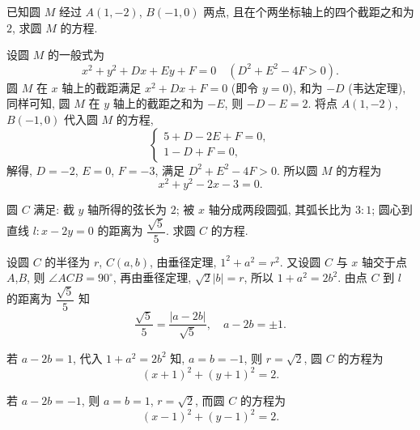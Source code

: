 \begin{exercise}
    已知圆 $M$ 经过 $A(1,-2)$, $B(-1,0)$ 两点, 且在个两坐标轴上的四个截距之和为 $2$, 求圆 $M$ 的方程.
\end{exercise}
\beginsolution
    设圆 $M$ 的一般式为
    \[x^2+y^2+Dx+Ey+F= 0\quad (D^2+E^2-4F>0).\]
    圆 $M$ 在 $x$ 轴上的截距满足 $x^2+Dx+F=0$ (即令 $y=0$), 和为 $-D$ (韦达定理), 同样可知, 圆 $M$ 在 $y$ 轴上的截距之和为 $-E$, 则 $-D-E=2$. 将点 $A(1,-2)$, $B(-1,0)$ 代入圆 $M$ 的方程,
    \[\left\{\!\!\begin{array}{l}
        5+D-2E+F=0,\\
        1-D+F=0,
    \end{array}\right.\]
    解得, $D=-2$, $E=0$, $F=-3$, 满足 $D^2+E^2- 4F>0$. 所以圆 $M$ 的方程为
    \[x^2+y^2-2x-3=0.\]
\endsolution

\begin{exercise}
    圆 $C$ 满足: 截 $y$ 轴所得的弦长为 $2$; 被 $x$ 轴分成两段圆弧, 其弧长比为 $3:1$; 圆心到直线 $l\colon x-2y=0$ 的距离为 $\dfrac{\sqrt5}5$. 求圆 $C$ 的方程.
\end{exercise}
\beginsolution
    设圆 $C$ 的半径为 $r$, $C(a,b)$, 由垂径定理, $1^2+a^2= r^2$. 又设圆 $C$ 与 $x$ 轴交于点 $A$,$B$, 则 $\angle ACB= 90^\circ$, 再由垂径定理, $\sqrt2|b|= r$, 所以 $1+a^2= 2b^2$. 由点 $C$ 到 $l$ 的距离为 $\dfrac{\sqrt5}5$ 知
    \[\frac{\sqrt5}5= \frac{|a-2b|}{\sqrt5},\quad a-2b= \pm1.\]

    若 $a-2b= 1$, 代入 $1+a^2= 2b^2$ 知, $a=b=-1$, 则 $r=\sqrt2$, 圆 $C$ 的方程为 
    \[(x+1)^2+ (y+1)^2= 2.\]

    若 $a-2b= -1$, 则 $a=b=1$, $r=\sqrt2$, 而圆 $C$ 的方程为 
    \[(x-1)^2+ (y-1)^2= 2.\]
\endsolution
